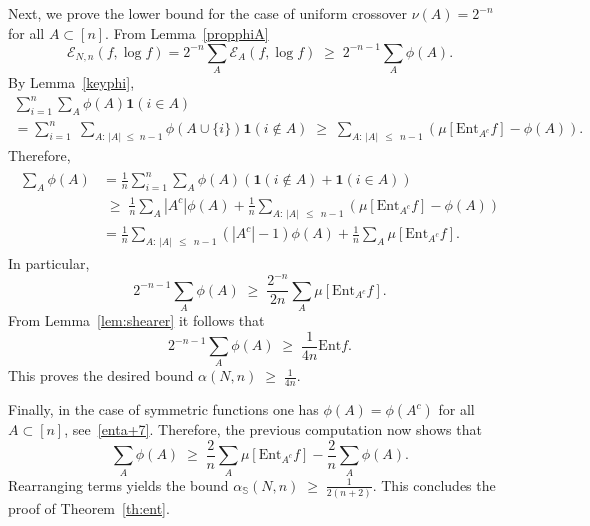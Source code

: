 \documentclass[10pt,a4paper]{amsart}
\renewcommand{\leq}{\;\leqslant\;}
\renewcommand{\geq}{\;\geqslant\;}
\newcommand{\ent}{\mathrm{Ent}}
\newcommand{\ind}{\mathbf{1}}
\newcommand{\cE}{\mathcal{E}}
\newcommand{\bbS}{\mathbb{S}}
\let\a=\alpha
\theoremstyle{definition}
\theoremstyle{plain}
\numberwithin{equation}{section}
\begin{document}
Next, we prove the lower bound for the case of uniform crossover $\nu(A)=2^{-n}$ for all $A\subset[n]$. From Lemma~\ref{propphiA}
\[
\cE_{N,n}(f,\log f)=2^{-n}\sum_A \cE_A(f,\log f)\geq 2^{-n-1}\sum_A \phi(A).
\]
By Lemma~\ref{keyphi},
\begin{multline*}
\sum_{i=1}^n\sum_{A}\phi(A)\ind(i\in A)\\
= \sum_{i=1}^n\;\sum_{A: \,|A|\leq n-1}\phi(A\cup\{i\})\ind(i\notin A)
\geq \sum_{A: \,|A|\,\leq\,n-1} \left(\mu\left[\ent_{A^c}f \right] - \phi(A)\right).
\end{multline*}
Therefore,
\begin{align}\label{enta+43}
\begin{split}
\sum_A \phi(A)&= \frac1n\sum_{i=1}^n\sum_{A}\phi(A)(\ind(i\notin A) +\ind(i\in A))
\\&\geq \frac1n\sum_{A}|A^c|\phi(A) + \frac1n\sum_{A: \,|A|\,\leq\,n-1}\left(\mu\left[\ent_{A^c}f \right] - \phi(A)\right) \\
&=\frac1n\sum_{A:\, |A|\,\leq\,n-1}(|A^c|-1)\phi(A) + \frac1n\sum_{A}\mu\left[\ent_{A^c}f \right].
\end{split}
\end{align}
In particular,
\[
2^{-n-1}\sum_A \phi(A)\geq \frac{2^{-n}}{2n}\sum_A\mu\left[\ent_{A^c}f \right].
\]
From Lemma~\ref{lem:shearer} it follows that
\[
2^{-n-1}\sum_A \phi(A)\geq \frac{1}{4n}\ent f.
\]
This proves the desired bound $\a(N,n)\geq \frac{1}{4n}$.

Finally, in the case of symmetric functions one has $\phi(A)=\phi(A^c)$ for all $A\subset[n]$, see~\eqref{enta+7}. Therefore, the previous computation now shows that
\[
\sum_A \phi(A)\geq \frac2n\sum_{A}\mu\left[\ent_{A^c}f \right] - \frac2n \sum_A \phi(A).
\]
Rearranging terms yields the bound $\a_\bbS(N,n)\geq \frac{1}{2(n+2)}$. This concludes the proof of Theorem~\ref{th:ent}.
\end{document}
